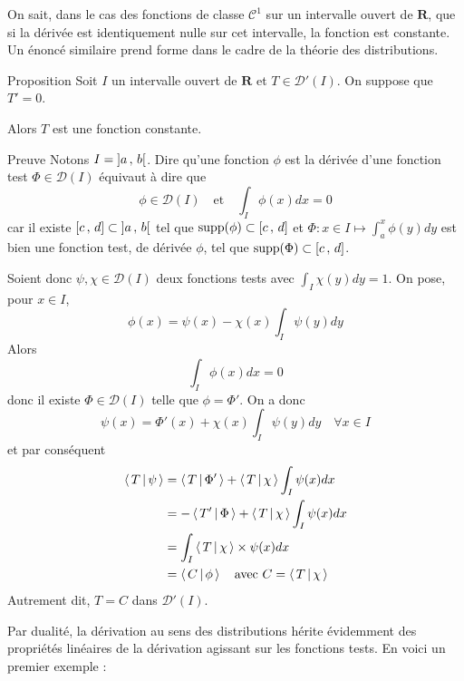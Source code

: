         On sait, dans le cas des fonctions de classe $\mathcal{C}^1$ sur un intervalle ouvert de $\mathbf{R}$, que si la dérivée est identiquement nulle sur cet intervalle, la fonction est constante. Un énoncé similaire prend forme dans le cadre de la théorie des distributions.

        \begin{omed}{Proposition}
            Soit $I$ un intervalle ouvert de $\mathbf{R}$ et $T \in \mathcal{D}'(I)$. On suppose que $T' = 0$.

            Alors $T$ est une fonction constante. 
        \end{omed}

        \begin{demo}{Preuve}
            Notons $I = \left] a \, , \, b \right[$. Dire qu’une fonction $\phi$ est la dérivée d’une fonction test $\Phi \in \mathcal{D}(I)$ équivaut à dire que 
            \[ \phi \in \mathcal{D}(I) \quad \text{et} \quad \int_{I} \phi(x)dx = 0 \]   
            car il existe $\left[ c \, , \, d \right] \subset \left] a \, , \, b \right[$ tel que $\text{supp}(\phi) \subset \left[ c \, , \, d \right]$ et $\Phi : x \in I \mapsto \int_{a}^{x} \phi(y) dy$ est bien une fonction test, de dérivée $\phi$, tel que $\text{supp}(\Phi) \subset \left[ c \, , \, d \right]$.
            
            Soient donc $\psi, \chi \in \mathcal{D}(I)$ deux fonctions tests avec $\int_I \chi(y) dy=1$. On pose, pour $x \in I$,
            \[ \phi(x) = \psi(x) - \chi(x) \int_I \psi(y)dy \]   
            Alors 
            \[ \int_I \phi(x)dx = 0 \]   
            donc il existe $\Phi \in \mathcal{D}(I)$ telle que $\phi = \Phi'$. On a donc 
            \[ \psi(x) = \Phi'(x) + \chi(x) \int_I \psi(y)dy \quad \forall x \in I \]   
            et par conséquent
            \begin{align*}
                \left< \, T \, \middle| \, \psi \, \right> 
                &= \left< \, T \, \middle| \, \Phi' \, \right> + \left< \, T \, \middle| \, \chi \, \right> \int_I \psi(x)dx \\
                &= - \left< \, T' \, \middle| \, \Phi \, \right> + \left< \, T \, \middle| \, \chi \, \right> \int_I \psi(x)dx \\
                &=  \int_I \left< \, T \, \middle| \, \chi \, \right> \times \psi(x)dx \\
                &= \left< \, C \, \middle| \, \phi \, \right> \quad \text{avec } C = \left< \, T \, \middle| \, \chi \, \right> 
            \end{align*}
            Autrement dit, $T = C$ dans $\mathcal{D}'(I)$.
        \end{demo}

        Par dualité, la dérivation au sens des distributions hérite évidemment des propriétés linéaires de la dérivation agissant sur les fonctions tests. En voici un premier exemple :

